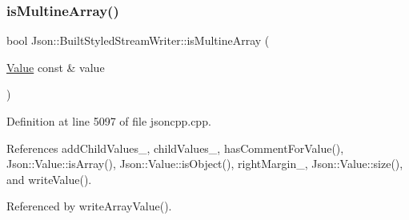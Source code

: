 \subsubsection{\texorpdfstring{is\+Multine\+Array()}{isMultineArray()}}
{\footnotesize\ttfamily bool Json\+::\+Built\+Styled\+Stream\+Writer\+::is\+Multine\+Array (\begin{DoxyParamCaption}\item[{\hyperlink{class_json_1_1_value}{Value} const \&}]{value }\end{DoxyParamCaption})\hspace{0.3cm}{\ttfamily [private]}}



Definition at line 5097 of file jsoncpp.\+cpp.



References add\+Child\+Values\+\_\+, child\+Values\+\_\+, has\+Comment\+For\+Value(), Json\+::\+Value\+::is\+Array(), Json\+::\+Value\+::is\+Object(), right\+Margin\+\_\+, Json\+::\+Value\+::size(), and write\+Value().



Referenced by write\+Array\+Value().


